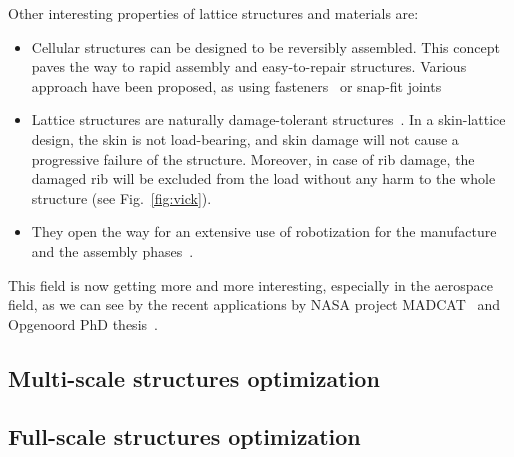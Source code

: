 Other interesting properties of lattice structures and materials are:
\begin{itemize}
    \item Cellular structures can be designed to be reversibly assembled. This concept paves the way to rapid assembly and easy-to-repair structures. Various approach have been proposed, as using fasteners~ or snap-fit joints~
    \item     
    
    Lattice structures are naturally damage-tolerant structures~. In a skin-lattice design, the skin is not load-bearing, and skin damage will not cause a progressive failure of the structure. Moreover, in case of rib damage, the damaged rib will be excluded from the load without any harm to the whole structure (see Fig.~\ref{fig:vick}).
    \item They open the way for an extensive use of robotization for the manufacture~ and the assembly phases~.
\end{itemize}

This field is now getting more and more interesting, especially in the aerospace field, as we can see by the recent applications by NASA project MADCAT~ and Opgenoord PhD thesis~.

\subsection{Multi-scale structures optimization}

\subsection{Full-scale structures optimization}

